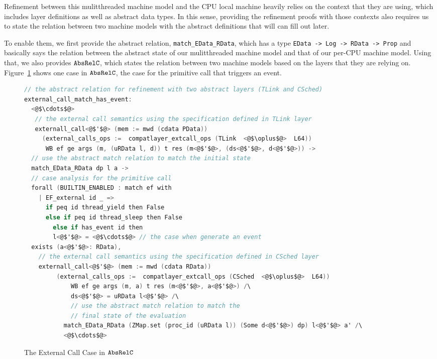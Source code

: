 Refinement between this mulitthreaded machine model and the CPU local machine heavily relies on
the context that they are using, 
which includes  layer definitions as well as  abstract data types.
In this sense, providing the refinement proofs with 
those contexts
also requires us to 
state the relation between two machine models 
with the abstract definitions that will can fill out later.

To enable them, 
we first provide the abstract relation, \lstinline$match_EData_RData$,
which has a type \lstinline$EData -> Log -> RData -> Prop$ and 
basically says the 
relation between the abstract state of our mulitthreaded machine model and 
that of our per-CPU machine model.
Using that, we also provides ${\mathrm{\texttt{AbsRelC}}}$,
which states the relation between two machine models based on the layers that they are relying on.
Figure~\ref{fig:chapter:conlink:two-cases-of-abs-rel-c} shows one case in ${\mathrm{\texttt{AbsRelC}}}$,
the case for the primitive call that triggers an event.  

\begin{figure}
\begin{lstlisting}[language=C]     
// the abstract relation for refinement with two abstract layers (TLink and CSched)
external_call_match_has_event:
  <@$\cdots$@>
   // the external call semantics using the specification defined in TLink layer
   externall_call<@$'$@> (mem := mwd (cdata PData)) 
     (external_calls_ops :=  compatlayer_extcall_ops (TLink  <@$\oplus$@>  L64))
      WB ef ge args (m, (uRData l, d)) t res (m<@$'$@>, (ds<@$'$@>, d<@$'$@>)) ->
  // use the abstract match relation to match the initial state
  match_EData_RData dp l a ->
  // case analysis for the primitive call
  forall (BUILTIN_ENABLED : match ef with
    | EF_external id _ => 
      if peq id thread_yield then False
      else if peq id thread_sleep then False
        else if has_event id then
        l<@$'$@> = <@$\cdots$@> // the case when generate an event   
  exists (a<@$'$@>: RData),
    // the external call semantics using the specification defined in CSched layer  
    externall_call<@$'$@> (mem := mwd (cdata RData)) 
         (external_calls_ops :=  compatlayer_extcall_ops (CSched  <@$\oplus$@>  L64))
             WB ef ge args (m, a) t res (m<@$'$@>, a<@$'$@>) /\
             ds<@$'$@> = uRData l<@$'$@> /\
             // use the abstract match relation to match the 
             // final state of the evaluation
           match_EData_RData (ZMap.set (proc_id (uRData l)) (Some d<@$'$@>) dp) l<@$'$@> a' /\
           <@$\cdots$@>
\end{lstlisting}
\caption{The External Call Case in ${\mathrm{\texttt{AbsRelC}}}$}
\label{fig:chapter:conlink:two-cases-of-abs-rel-c}
\end{figure}





